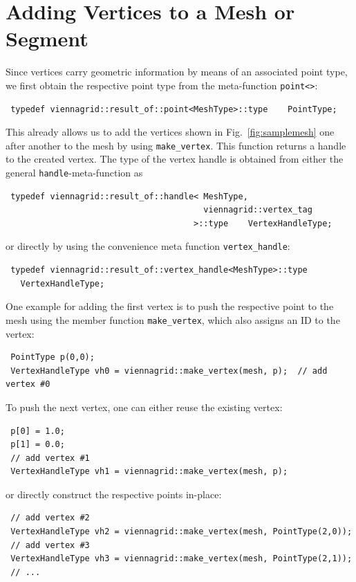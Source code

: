 \pagebreak

\section{Adding Vertices to a Mesh or Segment}
Since vertices carry geometric information by means of an associated point type, we first obtain the respective point type from the meta-function \lstinline|point<>|:
\begin{lstlisting}
 typedef viennagrid::result_of::point<MeshType>::type    PointType;
\end{lstlisting}
This already allows us to add the vertices shown in Fig.~\ref{fig:samplemesh} one after another to the mesh by using \lstinline|make_vertex|.
This function returns a handle to the created vertex.
The type of the vertex handle is obtained from either the general \texttt{handle}-meta-function as
\begin{lstlisting}
 typedef viennagrid::result_of::handle< MeshType,
                                        viennagrid::vertex_tag
                                      >::type    VertexHandleType;
\end{lstlisting}
or directly by using the convenience meta function \lstinline|vertex_handle|:
\begin{lstlisting}
 typedef viennagrid::result_of::vertex_handle<MeshType>::type 
   VertexHandleType;
\end{lstlisting}
One example for adding the first vertex is to push the respective point to the mesh using the member function \lstinline|make_vertex|, which also assigns an ID to the vertex:
\begin{lstlisting}
 PointType p(0,0);
 VertexHandleType vh0 = viennagrid::make_vertex(mesh, p);  // add vertex #0
\end{lstlisting} 

To push the next vertex, one can either reuse the existing vertex:
\begin{lstlisting}
 p[0] = 1.0;
 p[1] = 0.0;
 // add vertex #1
 VertexHandleType vh1 = viennagrid::make_vertex(mesh, p);
\end{lstlisting}

or directly construct the respective points in-place:
\begin{lstlisting}
 // add vertex #2
 VertexHandleType vh2 = viennagrid::make_vertex(mesh, PointType(2,0));
 // add vertex #3
 VertexHandleType vh3 = viennagrid::make_vertex(mesh, PointType(2,1));
 // ...
\end{lstlisting}

